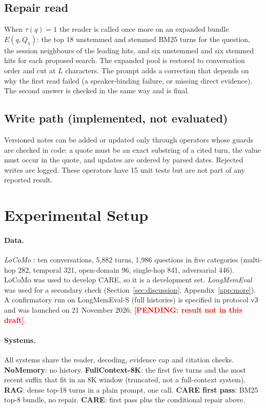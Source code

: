 \documentclass[10pt]{article}
\theoremstyle{plain}
\newcommand{\care}{\textsc{CARE}}
\newcommand{\pending}[1]{\textcolor{red}{\textbf{[PENDING: #1]}}}
\begin{document}
\subsection{Repair read}

When $\tau(q)=1$ the reader is called once more on an expanded bundle $E(q,Q_1)$: the top 18 unstemmed and stemmed
BM25 turns for the question, the session neighbours of the leading hits, and six unstemmed and six stemmed hits for
each proposed search. The expanded pool is restored to conversation order and cut at $L$ characters. The prompt adds
a correction that depends on why the first read failed (a speaker-binding failure, or missing direct evidence). The
second answer is checked in the same way and is final.

\subsection{Write path (implemented, not evaluated)}

Versioned notes can be added or updated only through operators whose guards are checked in code: a quote must be an
exact substring of a cited turn, the value must occur in the quote, and updates are ordered by parsed dates. Rejected
writes are logged. These operators have 15 unit tests but are not part of any reported result.

\section{Experimental Setup}
\label{sec:setup}

\paragraph{Data.} \emph{LoCoMo} \citep{maharana2024locomo}: ten conversations, 5,882 turns, 1,986 questions in five
categories (multi-hop 282, temporal 321, open-domain 96, single-hop 841, adversarial 446). LoCoMo was used to develop
\care{}, so it is a development set. \emph{LongMemEval} \citep{wu2024longmemeval} was used for a secondary check
(Section~\ref{sec:discussion}, Appendix~\ref{app:more}). A confirmatory run on LongMemEval-S (full histories) is
specified in protocol v3 and was launched on 21 November 2026; \pending{result not in this draft}.

\paragraph{Systems.} All systems share the reader, decoding, evidence cap and citation checks.
\textbf{NoMemory}: no history. \textbf{FullContext-8K}: the first five turns and the most recent suffix that fit in an
8K window (truncated, not a full-context system). \textbf{RAG}: dense top-18 turns in a plain prompt, one call.
\textbf{\care{} first pass}: BM25 top-8 bundle, no repair. \textbf{\care{}}: first pass plus the conditional repair
above.
\end{document}
